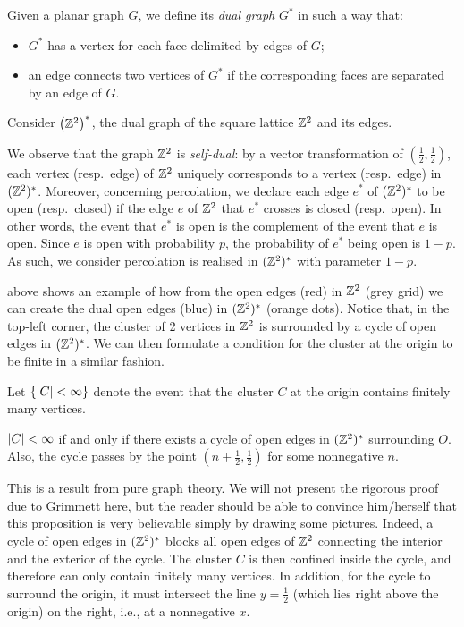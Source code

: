 \documentclass[a4paper, 12pt]{article}
\begin{document}
\begin{defn}\label{defn:dual_graph}
Given a planar graph $G$, we define its \textit{dual graph} $G^*$ in such a way that:
\begin{itemize}
    \item $G^*$ has a vertex for each face delimited by edges of $G$;
    \item an edge connects two vertices of $G^*$ if the corresponding faces are separated by an edge of $G$.
\end{itemize}
\end{defn}
\begin{ex}\label{ex:dual_lattice}
Consider $\left(\mathbb{Z}^2\right)^*$, the dual graph of the square lattice $\mathbb{Z}^2$ and its edges.


We observe that the graph $\mathbb{Z}^2$ is \textit{self-dual}: by a vector transformation of $(\frac{1}{2}, \frac{1}{2})$, each vertex (resp.\ edge) of $\mathbb{Z}^2$ uniquely corresponds to a vertex (resp.\ edge) in $(\mathbb{Z}^2)^*$. Moreover, concerning percolation, we declare each edge $e^*$ of $(\mathbb{Z}^2)^*$ to be open (resp.\ closed) if the edge $e$ of $\mathbb{Z}^2$ that $e^*$ crosses is closed (resp.\ open). In other words, the event that $e^*$ is open is the complement of the event that $e$ is open. Since $e$ is open with probability $p$, the probability of $e^*$ being open is $1 - p$. As such, we consider percolation is realised in $(\mathbb{Z}^2)^*$ with parameter $1 - p$.

 above shows an example of how from the open edges (red) in $\mathbb{Z}^2$ (grey grid) we can create the dual open edges (blue) in $(\mathbb{Z}^2)^*$ (orange dots). Notice that, in the top-left corner, the cluster of 2 vertices in $\mathbb{Z}^2$ is surrounded by a cycle of open edges in $(\mathbb{Z}^2)^*$. We can then formulate a condition for the cluster at the origin to be finite in a similar fashion.
\end{ex}

Let $\{\lvert C \rvert < \infty\}$ denote the event that the cluster $C$ at the origin contains finitely many vertices.

\begin{prop}\label{prop:c_finite_iff_cycle}
$\lvert C \rvert < \infty$ if and only if there exists a cycle of open edges in $(\mathbb{Z}^2)^*$ surrounding $O$. Also, the cycle passes by the point $(n + \frac{1}{2}, \frac{1}{2})$ for some nonnegative $n$.
\end{prop}

This is a result from pure graph theory. We will not present the rigorous proof due to Grimmett \autocite*[14--15]{grimmett_1999} here, but the reader should be able to convince him/herself that this proposition is very believable simply by drawing some pictures. Indeed, a cycle of open edges in $(\mathbb{Z}^2)^*$ blocks all open edges of $\mathbb{Z}^2$ connecting the interior and the exterior of the cycle. The cluster $C$ is then confined inside the cycle, and therefore can only contain finitely many vertices. In addition, for the cycle to surround the origin, it must intersect the line $y = \frac{1}{2}$ (which lies right above the origin) on the right, i.e., at a nonnegative $x$.
\end{document}
